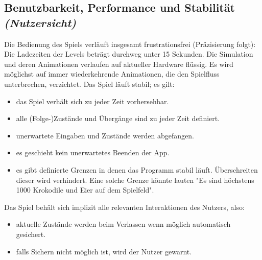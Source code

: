 \subsection{Benutzbarkeit, Performance und Stabilität \textit{(Nutzersicht)}}
\begin{requirements}
	 Die Bedienung des Spiels verläuft insgesamt frustrationsfrei (Präzisierung folgt):
	 Die Ladezeiten der Levels beträgt durchweg unter 15 Sekunden.
	 Die Simulation und deren Animationen verlaufen auf aktueller Hardware flüssig.
	 Es wird möglichst auf immer wiederkehrende Animationen, die den Spielfluss unterbrechen, verzichtet.
	 Das Spiel läuft stabil; es gilt:
		\begin{itemize}
			\item das Spiel verhält sich zu jeder Zeit vorhersehbar.
			\item alle (Folge-)Zustände und Übergänge sind zu jeder Zeit definiert.
			\item unerwartete Eingaben und Zustände werden abgefangen.
			\item es geschieht kein unerwartetes Beenden der App.
			\item es gibt definierte Grenzen in denen das Programm stabil läuft. Überschreiten dieser wird verhindert. Eine solche Grenze könnte lauten "Es sind höchstens 1000 Krokodile und Eier auf dem Spielfeld".
		\end{itemize}
	 Das Spiel behält sich implizit alle relevanten Interaktionen des Nutzers, also:
		\begin{itemize}
			\item aktuelle Zustände werden beim Verlassen wenn möglich automatisch gesichert.
			\item falls Sichern nicht möglich ist, wird der Nutzer gewarnt.
		\end{itemize}
\end{requirements}

